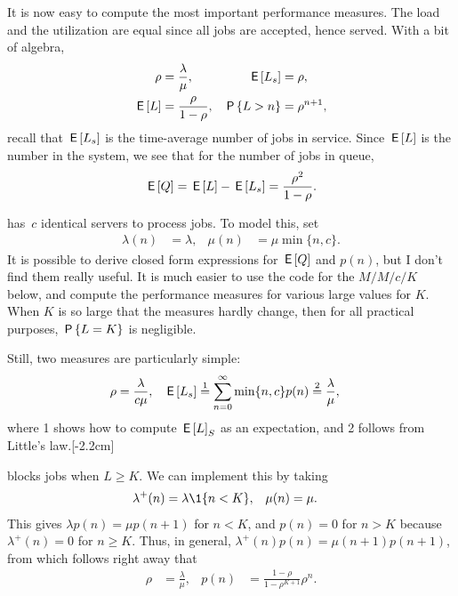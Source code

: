 \documentclass[stochastic-or.tex]{subfiles}
\begin{document}
It is now easy to compute the most important performance measures.
The load and the utilization are equal since all jobs are accepted, hence served.  With a bit of algebra,
\begin{align}\label{eq:el}
\rho &= \frac{\lambda}{\mu}, & \E{\Ls} &= \rho, \\
  \E \L &= \frac \rho{1-\rho}, & \P{\L> n} &= \rho^{n+1},
\end{align}
recall that $\E\Ls$ is the time-average number of jobs in service. Since $\E\L$ is the number in the system, we see that for the number of jobs in queue,
\begin{equation*}
\E \QQ = \E \L - \E{\Ls} = \frac{\rho^2}{1-\rho}.
\end{equation*}



 has~$c$ identical servers to process jobs.
To model this, set
\begin{align*}
\lambda(n) &= \lambda, & \mu(n) &= \mu \min\{n, c\}.
\end{align*}
It is possible to derive closed form expressions for $\E \QQ$ and $p(n)$, but I don't find them really useful.
It is much easier to use the code for the $M/M/c/K$ below, and compute the performance measures for various large values for $K$.
When $K$ is so large that the measures hardly change, then for all practical purposes, $\P{L=K}$ is negligible.

Still, two measures are particularly simple:
\begin{align*}
  \rho & = \frac{\lambda}{ c\mu}, & \E{\Ls} &\stackrel1= \sum_{n=0}^{\infty}\min\{n,c\} p(n) \stackrel2= \frac{\lambda}\mu,
\end{align*}
where 1 shows how to compute $\E L_{S}$ as an expectation, and 2 follows from Little's law.[-2.2cm]



 blocks jobs when $L\geq K$.
We can implement this by taking
\begin{align*}
\lambda^{+}(n) &= \lambda \1{n < K}, & \mu(n) &= \mu.
\end{align*}
This gives $\lambda p(n) = \mu p(n+1)$ for $n<K$, and $p(n) = 0$ for $n>K$ because $\lambda^{+}(n) = 0$ for $n\geq K$.
Thus, in general, $\lambda^{+}(n) p(n) = \mu(n+1)p(n+1)$, from which follows right away that
 \begin{align*}
\rho &= \frac{\lambda}{\mu}, & p(n) &= \frac{1-\rho}{1-\rho^{K+1}} \rho^n.
\end{align*}
\end{document}

